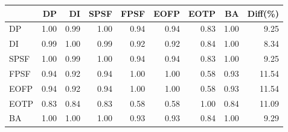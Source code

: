 \begin{tabular}{l|rrrrrrr|r}
\toprule
 & DP & DI & SPSF & FPSF & EOFP & EOTP & BA & Diff(\%)  \\
\midrule
DP & 1.00 & 0.99 & 1.00 & 0.94 & 0.94 & 0.83 & 1.00 & 9.25  \\
DI & 0.99 & 1.00 & 0.99 & 0.92 & 0.92 & 0.84 & 1.00 & 8.34  \\
SPSF & 1.00 & 0.99 & 1.00 & 0.94 & 0.94 & 0.83 & 1.00 & 9.25  \\
FPSF & 0.94 & 0.92 & 0.94 & 1.00 & 1.00 & 0.58 & 0.93 & 11.54  \\
EOFP & 0.94 & 0.92 & 0.94 & 1.00 & 1.00 & 0.58 & 0.93 & 11.54  \\
EOTP & 0.83 & 0.84 & 0.83 & 0.58 & 0.58 & 1.00 & 0.84 & 11.09  \\
BA & 1.00 & 1.00 & 1.00 & 0.93 & 0.93 & 0.84 & 1.00 & 9.29  \\
\bottomrule
\end{tabular}

